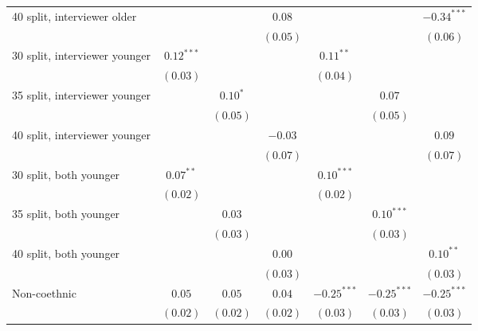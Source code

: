 \begin{table}
\begin{center}
\begin{threeparttable}
\begin{tabular}{l c c c c c c}
40 split, interviewer older     &               &               & $0.08$        &               &               & $-0.34^{***}$ \\
                                &               &               & $(0.05)$      &               &               & $(0.06)$      \\
30 split, interviewer younger   & $0.12^{***}$  &               &               & $0.11^{**}$   &               &               \\
                                & $(0.03)$      &               &               & $(0.04)$      &               &               \\
35 split, interviewer younger   &               & $0.10^{*}$    &               &               & $0.07$        &               \\
                                &               & $(0.05)$      &               &               & $(0.05)$      &               \\
40 split, interviewer younger   &               &               & $-0.03$       &               &               & $0.09$        \\
                                &               &               & $(0.07)$      &               &               & $(0.07)$      \\
30 split, both younger          & $0.07^{**}$   &               &               & $0.10^{***}$  &               &               \\
                                & $(0.02)$      &               &               & $(0.02)$      &               &               \\
35 split, both younger          &               & $0.03$        &               &               & $0.10^{***}$  &               \\
                                &               & $(0.03)$      &               &               & $(0.03)$      &               \\
40 split, both younger          &               &               & $0.00$        &               &               & $0.10^{**}$   \\
                                &               &               & $(0.03)$      &               &               & $(0.03)$      \\
Non-coethnic                    & $0.05$        & $0.05$        & $0.04$        & $-0.25^{***}$ & $-0.25^{***}$ & $-0.25^{***}$ \\
                                & $(0.02)$      & $(0.02)$      & $(0.02)$      & $(0.03)$      & $(0.03)$      & $(0.03)$      \\

\end{tabular}
\end{threeparttable}
\end{center}
\end{table}
